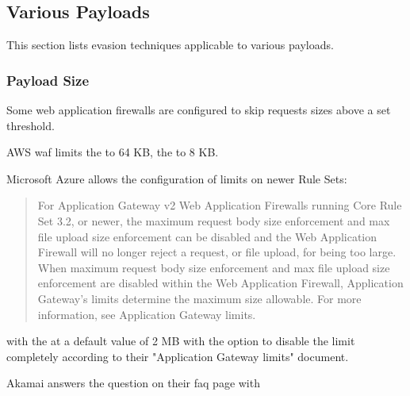 \subsection{Various Payloads}
\label{sec:varioustech}
This section lists evasion techniques applicable to various payloads.

\subsubsection{Payload Size}
\label{sec:payloadsize}
Some web application firewalls are configured to skip requests sizes above a set threshold.

AWS \acrshort{waf} limits the  to 64 KB, the  to 8 KB. \cite{aws/waflimits}

Microsoft Azure allows the configuration of limits on newer Rule Sets:
\begin{quote}
	For Application Gateway v2 Web Application Firewalls running Core Rule Set 3.2, or newer, the maximum request body size enforcement and max file upload size enforcement can be disabled and the Web Application Firewall will no longer reject a request, or file upload, for being too large. When maximum request body size enforcement and max file upload size enforcement are disabled within the Web Application Firewall, Application Gateway's limits determine the maximum size allowable. For more information, see Application Gateway limits. \cite{ms/azurewaflimits}
\end{quote}
with the  at a default value of 2 MB with the option to disable the limit completely according to their "Application Gateway limits" document. \cite{ms/appgatewaylimits}

Akamai answers the question  on their \acrshort{faq} page with  \cite{akamai/waflimits}

